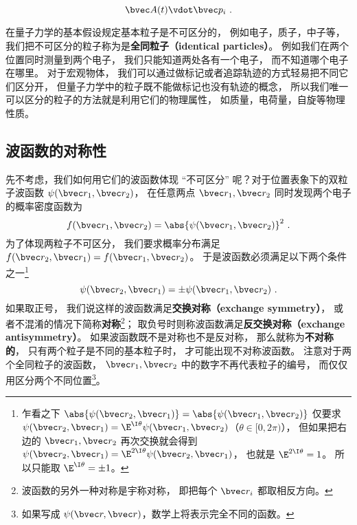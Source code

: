 

\begin{equation}
\bvec A(t) \vdot \bvec p_i~.
\end{equation}


在量子力学的基本假设规定基本粒子是不可区分的， 例如电子，质子，中子等， 我们把不可区分的粒子称为是\textbf{全同粒子（identical particles）}。 例如我们在两个位置同时测量到两个电子， 我们只能知道两处各有一个电子， 而不知道哪个电子在哪里。 对于宏观物体， 我们可以通过做标记或者追踪轨迹的方式轻易把不同它们区分开， 但量子力学中的粒子既不能做标记也没有轨迹的概念， 所以我们唯一可以区分的粒子的方法就是利用它们的物理属性， 如质量，电荷量，自旋等物理性质。

\subsection{波函数的对称性}
先不考虑，我们如何用它们的波函数体现 “不可区分” 呢？对于位置表象下的双粒子波函数 $\psi(\bvec r_1, \bvec r_2)$， 在任意两点 $\bvec r_1, \bvec r_2$ 同时发现两个电子的概率密度函数为%
\begin{equation}
f(\bvec r_1, \bvec r_2) = \abs{\psi(\bvec r_1, \bvec r_2)}^2~.
\end{equation}
为了体现两粒子不可区分， 我们要求概率分布满足 $f(\bvec r_2, \bvec r_1) = f(\bvec r_1, \bvec r_2)$。 于是波函数必须满足以下两个条件之一\footnote{乍看之下 $\abs{\psi(\bvec r_2, \bvec r_1)} = \abs{\psi(\bvec r_1, \bvec r_2)}$ 仅要求 $\psi(\bvec r_2, \bvec r_1) = \E^{\I \theta} \psi(\bvec r_1, \bvec r_2)$（$\theta \in [0, 2\pi)$）， 但如果把右边的 $\bvec r_1, \bvec r_2$ 再次交换就会得到 $\psi(\bvec r_2, \bvec r_1) = \E^{2\I \theta} \psi(\bvec r_2, \bvec r_1)$， 也就是 $\E^{2\I \theta} = 1$。 所以只能取 $\E^{\I\theta} = \pm 1$。}
\begin{equation}\label{eq_IdPar_5}
\psi(\bvec r_2, \bvec r_1) = \pm \psi(\bvec r_1, \bvec r_2)~.
\end{equation}
如果取正号， 我们说这样的波函数满足\textbf{交换对称（exchange symmetry）}， 或者不混淆的情况下简称\textbf{对称}\footnote{波函数的另外一种对称是宇称对称，%
即把每个 $\bvec r_i$ 都取相反方向。}； 取负号时则称波函数满足\textbf{反交换对称（exchange antisymmetry）}。 如果波函数既不是对称也不是反对称， 那么就称为\textbf{不对称的}， 只有两个粒子是不同的基本粒子时， 才可能出现不对称波函数。 注意对于两个全同粒子的波函数， $\bvec r_1, \bvec r_2$ 中的数字不再代表粒子的编号， 而仅仅用区分两个不同位置\footnote{如果写成 $\psi(\bvec r, \bvec r)$，数学上将表示完全不同的函数。}。

